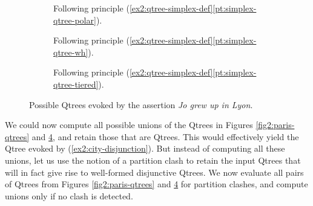 \begin{figure}[H]
	\centering
	\begin{subfigure}[t]{.23\linewidth}
		\centering
		\caption{Following principle (\ref{ex2:qtree-simplex-def}\ref{pt:simplex-qtree-polar}).}\label{fig2:lyon-qtree-polar}
	\end{subfigure}
	\hfill
	\begin{subfigure}[t]{.33\linewidth}
		\centering		{}
		\caption{Following principle (\ref{ex2:qtree-simplex-def}\ref{pt:simplex-qtree-wh}).}\label{fig2:lyon-qtree-wh}
	\end{subfigure}
	\hfill
	\begin{subfigure}[t]{.38\linewidth}
		\centering{}
		\caption{Following principle (\ref{ex2:qtree-simplex-def}\ref{pt:simplex-qtree-tiered}).}\label{fig2:lyon-qtree-tiered}
	\end{subfigure}
	\caption{Possible Qtrees evoked by the assertion \textit{Jo grew up in Lyon}.}\label{fig2:lyon-qtrees}
\end{figure}

We could now compute all possible unions of the Qtrees in Figures \ref{fig2:paris-qtrees} and \ref{fig2:lyon-qtrees}, and retain those that are Qtrees. This would effectively yield the Qtree evoked by (\ref{ex2:city-disjunction}). But instead of computing all these unions, let us use the notion of a partition clash to retain the input Qtrees that will in fact give rise to well-formed disjunctive Qtrees. We now evaluate all pairs of Qtrees from Figures \ref{fig2:paris-qtrees} and \ref{fig2:lyon-qtrees} for partition clashes, and compute unions only if no clash is detected.

